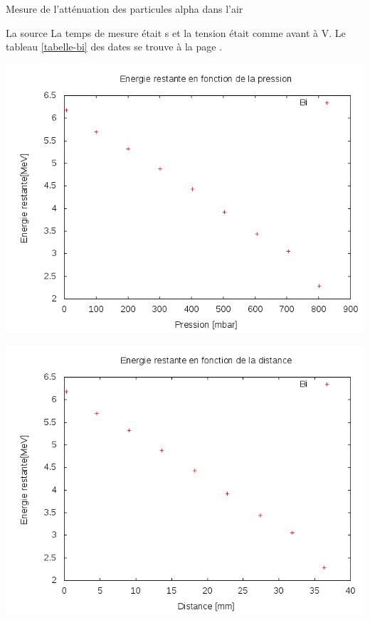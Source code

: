 \documentclass[a4paper,11pt,liststotocnumbered,bibtotocnumbered]{scrartcl}
\begin{document}
\begin{section}{Mesure de l'atténuation des particules alpha dans l'air}
   \begin{subsection}{La source }
    La temps de mesure était \unit[30]{s} et la tension était comme avant à \unit[80]{V}. Le tableau \ref{tabelle-bi} des dates se trouve à la page \pageref{tabelle-bi}.\\
    \begin{minipage}{0.45\textwidth}
     \includegraphics[width=\textwidth]{Sabine/bi_pression.png}
    \end{minipage}
    \hfill
    \begin{minipage}{0.45\textwidth}
     \includegraphics[width=\textwidth]{Sabine/bi_distance.png}
    \end{minipage}
   \end{subsection}
  

\end{section}
\end{document}

